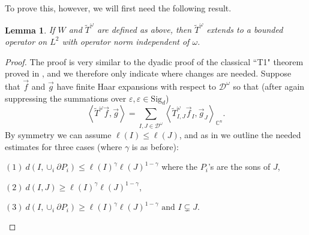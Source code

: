 \documentclass[12pt,reqno ]{amsart}
\numberwithin{equation}{section}
\newtheorem{lemma}[theorem]{Lemma}
\theoremstyle{definition}
\newcommand{\C}{\ensuremath{\mathbb{C}^n}}
\newcommand{\D}{\ensuremath{\mathscr{D}}}
\newcommand{\V}[1]{\ensuremath{\vec{#1}}}
\newcommand{\ip}[2]{\ensuremath{\left\langle#1,#2\right\rangle}}
\newcommand{\W}[1]{\ensuremath{\widetilde{#1}}}
\renewcommand{\S}{\ensuremath{\text{Sig}_d}}
\begin{document}
To prove this, however, we will first need the following result.

\begin{lemma}\label{T1Lem} If $W$ and $\W{T}^\omega$ are defined as above, then $\W{T}^\omega$ extends to a bounded operator on $L^2$ with operator norm independent of $\omega$.  \end{lemma}

\begin{proof} The proof is very similar to the dyadic proof of the classical ``T1" theorem proved in \cite{CT}, and we therefore only indicate where changes are needed. Suppose that $\V{f}$ and $\V{g}$ have finite Haar expansions with respect to $\D^\omega$ so that (after again suppressing the summations over $\varepsilon, \varepsilon \in \S$) \begin{equation*} \ip{\W{T}^\omega \V{f}}{\V{g}} = \sum_{I, J \in \D^\omega} \ip{\W{T}^\omega _{I, J}\V{f}_{I}}{\V{g}_J}_{\C}. \end{equation*}  By symmetry we can assume $\ell(I) \leq \ell(J)$, and as in \cite{CT} we outline the needed estimates for three cases (where $\gamma$ is as before): \begin{list}{}{}
\item $(1) \  d(I, \cup_i \partial P_i) \leq \ell(I)^\gamma \ell(J)^{1 - \gamma} $ where the $P_i$'s are the sons of $J$,
\item $(2) \ d(I, J) \geq \ell(I)^\gamma \ell(J)^{1 - \gamma}$,
\item $(3) \ d(I, \cup_i \partial P_i) \geq \ell(I) ^\gamma \ell(J)^{1 - \gamma} \text{ and } I \subsetneq J.$    \end{list}


\end{proof}
\end{document}
